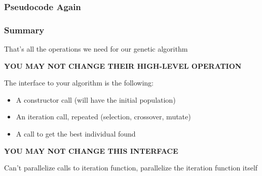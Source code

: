 \documentclass[aspectratio=169,10pt,compress]{beamer}
\begin{document}
\begin{frame}
  \frametitle{Pseudocode Again}

  \begin{center}
  \end{center}
\end{frame}

\begin{frame}
  \frametitle{Summary}

  That's all the operations we need for our genetic algorithm

  {\bf YOU MAY NOT CHANGE THEIR HIGH-LEVEL OPERATION}

  \vspace{2em}
  
  The interface to your algorithm is the following:
  \begin{itemize}
    \item A constructor call (will have the initial population)
    \item An iteration call, repeated (selection, crossover, mutate)
    \item A call to get the best individual found
  \end{itemize}

  {\bf YOU MAY NOT CHANGE THIS INTERFACE}

  \vspace{2em}

  Can't parallelize calls to iteration function, parallelize the iteration
  function itself
\end{frame}
\end{document}
